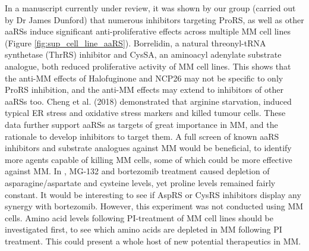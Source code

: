 \noindent
In a manuscript currently under review, it was shown by our group (carried out by Dr James Dunford) that numerous inhibitors targeting ProRS, as well as other aaRSs induce significant anti-proliferative effects across multiple MM cell lines (Figure \ref{fig:sup_cell_line_aaRS})\cite{bottpreclinical2022}.
Borrelidin, a natural threonyl-tRNA synthetase (ThrRS) inhibitor and CysSA, an aminoacyl adenylate substrate analogue, both reduced proliferative activity of MM cell lines.
This shows that the anti-MM effects of Halofuginone and NCP26 may not be specific to only ProRS inhibition, and the anti-MM effects may extend to inhibitors of other aaRSs too.
Cheng et al. (2018) demonstrated that arginine starvation, induced typical ER stress and oxidative stress markers and killed tumour cells\cite{cheng2018arginine}.
These data further support aaRSs as targets of great importance in MM, and the rationale to develop inhibitors to target them.
A full screen of known aaRS inhibitors and substrate analogues against MM would be beneficial, to identify more agents capable of killing MM cells, some of which could be more effective against MM\@.
In \cite{suraweera2012failure}, MG-132 and bortezomib treatment caused depletion of asparagine/aspartate and cysteine levels, yet proline levels remained fairly constant.
It would be interesting to see if AspRS or CysRS inhibitors display any synergy with bortezomib.
However, this experiment was not conducted using MM cells.
Amino acid levels following PI-treatment of MM cell lines should be investigated first, to see which amino acids are depleted in MM following PI treatment.
This could present a whole host of new potential therapeutics in MM\@.






